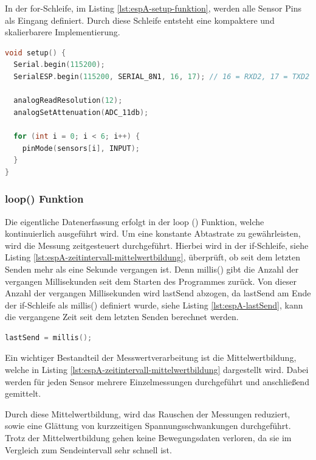 \noindent
In der for-Schleife, im Listing \ref{lst:espA-setup-funktion}, werden alle Sensor Pins als Eingang definiert. Durch diese Schleife entsteht eine kompaktere und skalierbarere Implementierung.

\begin{lstlisting}[language=C++, caption={setup() Funktion}, label={lst:espA-setup-funktion}, firstnumber=9]
void setup() {
  Serial.begin(115200); 
  SerialESP.begin(115200, SERIAL_8N1, 16, 17); // 16 = RXD2, 17 = TXD2

  analogReadResolution(12);      
  analogSetAttenuation(ADC_11db); 

  for (int i = 0; i < 6; i++) {
    pinMode(sensors[i], INPUT);
  }
}
\end{lstlisting}

\subsubsection{loop() Funktion}
Die eigentliche Datenerfassung erfolgt in der loop () Funktion, welche kontinuierlich ausgeführt wird. Um eine konstante Abtastrate zu gewährleisten, wird die Messung zeitgesteuert durchgeführt. 
Hierbei wird in der if-Schleife, siehe Listing \ref{lst:espA-zeitintervall-mittelwertbildung}, überprüft, ob seit dem letzten Senden mehr als eine Sekunde vergangen ist. Denn millis() gibt die Anzahl der vergangen Millisekunden seit dem Starten des Programmes zurück. Von dieser Anzahl der vergangen Millisekunden wird lastSend abzogen, 
da lastSend am Ende der if-Schleife als millis() definiert wurde, siehe Listing \ref{lst:espA-lastSend}, kann die vergangene Zeit seit dem letzten Senden berechnet werden.

\begin{lstlisting}[language=C++, caption={Definition von lastSend}, label={lst:espA-lastSend}, firstnumber=63]
  lastSend = millis();
\end{lstlisting}

\noindent
Ein wichtiger Bestandteil der Messwertverarbeitung ist die Mittelwertbildung, welche in Listing \ref{lst:espA-zeitintervall-mittelwertbildung} dargestellt wird. Dabei werden für jeden Sensor mehrere Einzelmessungen durchgeführt und anschließend gemittelt.

\noindent
Durch diese Mittelwertbildung, wird das Rauschen der Messungen reduziert, sowie eine Glättung von kurzzeitigen Spannungsschwankungen durchgeführt. Trotz der Mittelwertbildung gehen keine Bewegungsdaten verloren, da sie im Vergleich zum Sendeintervall  sehr schnell ist.

